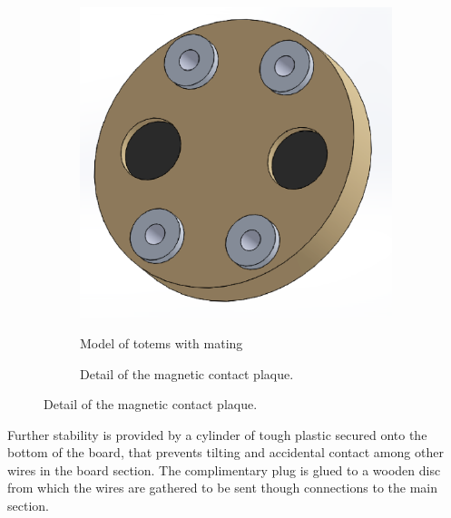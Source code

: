 \documentclass[a4paper,twoside]{book}
\begin{document}
\begin{figure}
\begin{subfigure}[b]{0.4\textwidth}
  \end{subfigure}\quad
  \begin{subfigure}[b]{0.4\textwidth}
    \includegraphics[width=\textwidth]{img/placca_contatto}
  \end{subfigure}
  
  \begin{subfigure}[t]{0.4\textwidth}
    \caption{Model of totems with mating}
  \end{subfigure}\quad
  \begin{subfigure}[t]{0.4\textwidth}
    \caption{Detail of the magnetic contact plaque.}
    \end{subfigure}
\end{figure}

Further stability is provided by a cylinder of tough plastic secured onto the bottom of the board, that prevents tilting and accidental contact among other wires in the board section. The complimentary plug is glued to a wooden disc from which the wires are gathered to be sent though connections to the main section.
\end{document}

